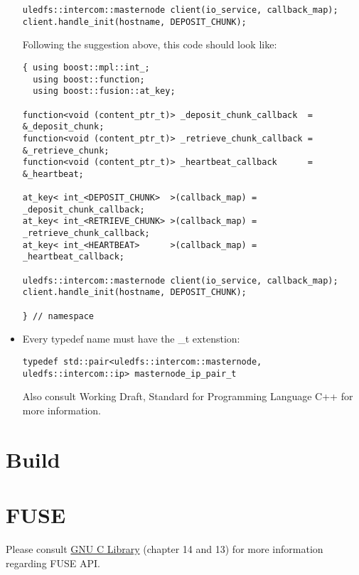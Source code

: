 \documentclass{article}
\begin{document}
\begin{itemize}
\begin{lstlisting}
uledfs::intercom::masternode client(io_service, callback_map);
client.handle_init(hostname, DEPOSIT_CHUNK);

\end{lstlisting}

Following the suggestion above, this code should look like:

\begin{lstlisting}
{ using boost::mpl::int_;
  using boost::function;
  using boost::fusion::at_key;

function<void (content_ptr_t)> _deposit_chunk_callback  = &_deposit_chunk;
function<void (content_ptr_t)> _retrieve_chunk_callback = &_retrieve_chunk;
function<void (content_ptr_t)> _heartbeat_callback      = &_heartbeat;

at_key< int_<DEPOSIT_CHUNK>  >(callback_map) =  _deposit_chunk_callback;
at_key< int_<RETRIEVE_CHUNK> >(callback_map) =  _retrieve_chunk_callback;
at_key< int_<HEARTBEAT>      >(callback_map) =  _heartbeat_callback;

uledfs::intercom::masternode client(io_service, callback_map);
client.handle_init(hostname, DEPOSIT_CHUNK);

} // namespace
\end{lstlisting}
\item Every typedef name must have the \_t extenstion:

\begin{lstlisting}
typedef std::pair<uledfs::intercom::masternode, uledfs::intercom::ip> masternode_ip_pair_t
\end{lstlisting}

Also consult Working Draft, Standard for Programming Language C++ for more information. 

\end{itemize}

\section{Build}

\section{FUSE}

Please consult \href{http://www.gnu.org/software/libc/manual/html_node/index.html}{GNU C Library} (chapter 14 and 13) for more information regarding FUSE API.
\end{document}
